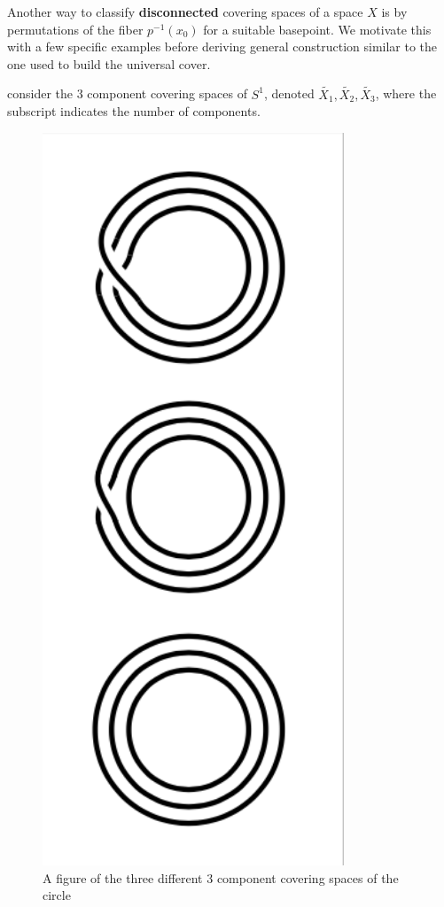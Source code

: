 \documentclass[10pt]{article}
\begin{document}
Another way to classify \textbf{disconnected} covering spaces of a space $X$
is by permutations of the fiber $p^{-1}(x_0)$ for a suitable basepoint. We
motivate this with a few specific examples before deriving general construction
similar to the one used to build the universal cover.

\begin{note}
	consider the 3 component covering spaces of $S^1$, denoted
	$\tilde{X_1}, \tilde{X_2}, \tilde{X_3}$, where the subscript indicates the
	number of components.
\end{note}

\begin{figure}[ht!]
\centering
\includegraphics[width=90mm]{3-component-covering-spaces-of-s1.png}
\caption{A figure of the three different 3 component covering spaces of the circle}
\end{figure}
\end{document}

